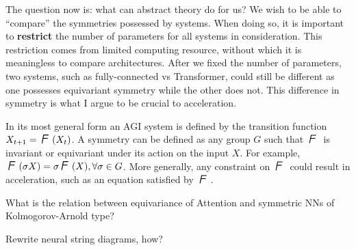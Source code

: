 The question now is:  what can abstract theory do for us?  We wish to be able to ``compare'' the symmetries possessed by systems.  When doing so, it is important to \textbf{restrict} the number of parameters for all systems in consideration.  This restriction comes from limited computing resource, without which it is meaningless to compare architectures.  After we fixed the number of parameters, two systems, such as fully-connected vs Transformer, could still be different as one possesses equivariant symmetry while the other does not.  This difference in symmetry is what I argue to be crucial to acceleration.

In its most general form an AGI system is defined by the transition function $X_{t+1} = \squareF(X_t)$.  A symmetry can be defined as any group $G$ such that $\squareF$ is invariant or equivariant under its action on the input $X$.  For example, $\squareF(\sigma X) = \sigma \squareF(X), \forall \sigma \in G$.  More generally, any constraint on $\squareF$ could result in acceleration, such as an equation satisfied by $\squareF$.

What is the relation between equivariance of Attention and symmetric NNs of Kolmogorov-Arnold type?

Rewrite neural string diagrams, how?
